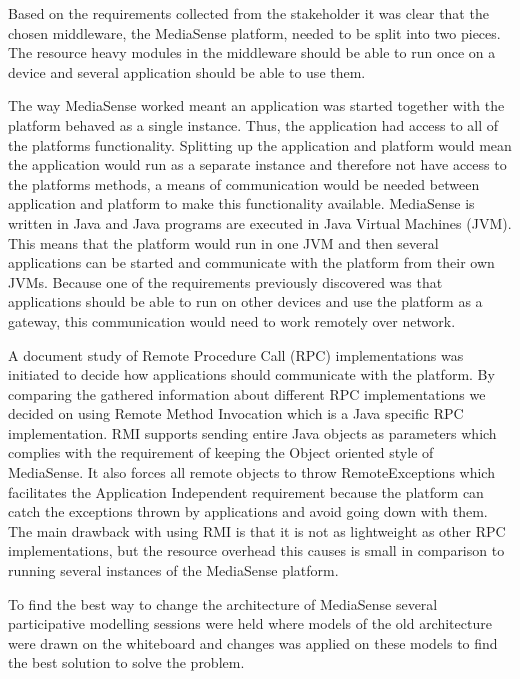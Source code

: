 Based on the requirements collected from the stakeholder it was clear that the chosen middleware, the MediaSense platform, needed to be split into two pieces. The resource heavy modules in the middleware should be able to run once on a device and several application should be able to use them. 

The way MediaSense worked meant an application was started together with the platform behaved as a single instance. Thus, the application had access to all of the platforms functionality. Splitting up the application and platform would mean the application would run as a separate instance and therefore not have access to the platforms methods, a means of communication would be needed between application and platform to make this functionality available. MediaSense is written in Java and Java programs are executed in Java Virtual Machines (JVM). This means that the platform would run in one JVM and then several applications can be started and communicate with the platform from their own JVMs. Because one of the requirements previously discovered was that applications should be able to run on other devices and use the platform as a gateway, this communication would need to work remotely over network.

A document study of Remote Procedure Call (RPC) implementations was initiated to decide how applications should communicate with the platform. By comparing the gathered information about different RPC implementations we decided on using Remote Method Invocation which is a Java specific RPC implementation. RMI supports sending entire Java objects as parameters which complies with the requirement of keeping the Object oriented style of MediaSense. It also forces all remote objects to throw RemoteExceptions which facilitates the Application Independent requirement because the platform can catch the exceptions thrown by applications and avoid going down with them. The main drawback with using RMI is that it is not as lightweight as other RPC implementations, but the resource overhead this causes is small in comparison to running several instances of the MediaSense platform.

To find the best way to change the architecture of MediaSense several participative modelling sessions were held where models of the old architecture were drawn on the whiteboard and changes was applied on these models to find the best solution to solve the problem.

